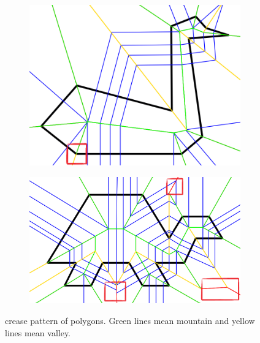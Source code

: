 \documentclass[11pt]{article}
\begin{document}
 \begin{figure}[H]
\centering
  \begin{subfigure}[b]{0.28\textwidth}
    \includegraphics[width=\textwidth]{FIGS/Part4/cr_w}
    \caption{}
    \label{fig:crease01}
  \end{subfigure}
  \begin{subfigure}[b]{0.48\textwidth}
    \includegraphics[width=\textwidth]{FIGS/Part4/cr_m}
    \caption{}
     \label{fig:crease02}
  \end{subfigure}
    \caption{crease pattern of polygons. Green lines mean mountain and yellow lines mean valley.}
    \label{fig:crease}
\end{figure}
\end{document}

